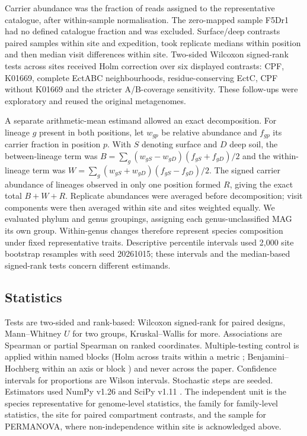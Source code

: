 \documentclass[11pt]{article}
\begin{document}
Carrier abundance was the fraction of reads assigned to the representative catalogue, after within-sample normalisation. The zero-mapped sample F5Dr1 had no defined catalogue fraction and was excluded. Surface/deep contrasts paired samples within site and expedition, took replicate medians within position and then median visit differences within site. Two-sided Wilcoxon signed-rank tests across sites received Holm correction over six displayed contrasts: CPF, K01669, complete EctABC neighbourhoods, residue-conserving EctC, CPF without K01669 and the stricter A/B-coverage sensitivity. These follow-ups were exploratory and reused the original metagenomes.

A separate arithmetic-mean estimand allowed an exact decomposition. For lineage $g$ present in both positions, let $w_{gp}$ be relative abundance and $f_{gp}$ its carrier fraction in position $p$. With $S$ denoting surface and $D$ deep soil, the between-lineage term was $B=\sum_g(w_{gS}-w_{gD})(f_{gS}+f_{gD})/2$ and the within-lineage term was $W=\sum_g(w_{gS}+w_{gD})(f_{gS}-f_{gD})/2$. The signed carrier abundance of lineages observed in only one position formed $R$, giving the exact total $B+W+R$. Replicate abundances were averaged before decomposition; visit components were then averaged within site and sites weighted equally. We evaluated phylum and genus groupings, assigning each genus-unclassified MAG its own group. Within-genus changes therefore represent species composition under fixed representative traits. Descriptive percentile intervals used 2{,}000 site bootstrap resamples with seed 20261015; these intervals and the median-based signed-rank tests concern different estimands.

\subsection*{Statistics}
Tests are two-sided and rank-based: Wilcoxon signed-rank for paired designs, Mann--Whitney $U$ for
two groups, Kruskal--Wallis for more. Associations are Spearman or partial Spearman on ranked
coordinates. Multiple-testing control is applied within named blocks (Holm across traits within a
metric \citep{holm1979multiple}; Benjamini--Hochberg within an axis or block \citep{benjamini1995fdr})
and never across the paper. Confidence intervals for proportions are Wilson intervals. Stochastic
steps are seeded. Estimators used NumPy v1.26 \citep{harris2020numpy} and SciPy v1.11
\citep{virtanen2020scipy}. The independent unit is the species representative for genome-level
statistics, the family for family-level statistics, the site for paired compartment contrasts, and
the sample for PERMANOVA, where non-independence within site is acknowledged above.
\end{document}
